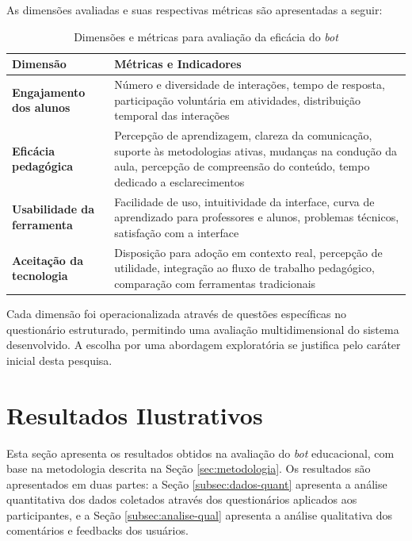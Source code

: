 As dimensões avaliadas e suas respectivas métricas são apresentadas a seguir:

\begin{table}[H]
\centering
\caption{Dimensões e métricas para avaliação da eficácia do \textit{bot}}
\label{tab:dimensoes-metricas}
\begin{tabular}{|p{3cm}|p{9cm}|}
\hline
\textbf{Dimensão} & \textbf{Métricas e Indicadores} \\
\hline
\textbf{Engajamento dos alunos} & Número e diversidade de interações, tempo de
resposta, participação voluntária em atividades, distribuição temporal das
interações \\
\hline
\textbf{Eficácia pedagógica} & Percepção de aprendizagem, clareza da comunicação,
suporte às metodologias ativas, mudanças na condução da aula, percepção de
compreensão do conteúdo, tempo dedicado a esclarecimentos \\
\hline
\textbf{Usabilidade da ferramenta} & Facilidade de uso, intuitividade da
interface, curva de aprendizado para professores e alunos, problemas técnicos,
satisfação com a interface \\
\hline
\textbf{Aceitação da tecnologia} & Disposição para adoção em contexto real,
percepção de utilidade, integração ao fluxo de trabalho pedagógico, comparação
com ferramentas tradicionais \\
\hline
\end{tabular}
\end{table}

Cada dimensão foi operacionalizada através de questões específicas no
questionário estruturado, permitindo uma avaliação multidimensional do sistema
desenvolvido. A escolha por uma abordagem exploratória se justifica pelo caráter
inicial desta pesquisa.

\section{Resultados Ilustrativos}
\label{sec:resultados}

Esta seção apresenta os resultados obtidos na avaliação do \textit{bot}
educacional, com base na metodologia descrita na Seção \ref{sec:metodologia}. Os
resultados são apresentados em duas partes: a Seção \ref{subsec:dados-quant}
apresenta a análise quantitativa dos dados coletados através dos questionários
aplicados aos participantes, e a Seção \ref{subsec:analise-qual} apresenta a
análise qualitativa dos comentários e feedbacks dos usuários.

